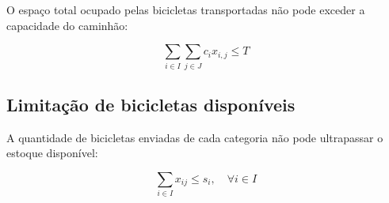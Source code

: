 \documentclass[]{article}
\begin{document}
O espaço total ocupado pelas bicicletas transportadas não pode exceder a capacidade do caminhão:

\begin{equation}
\sum_{i \in I} \sum_{j \in J} c_i x_{i,j} \leq T
\end{equation}

\subsection{Limitação de bicicletas disponíveis}

A quantidade de bicicletas enviadas de cada categoria não pode ultrapassar o estoque disponível:

\begin{equation}
\sum_{i \in I} x_{ij} \leq s_i, \quad \forall i \in I
\end{equation}
\end{document}
